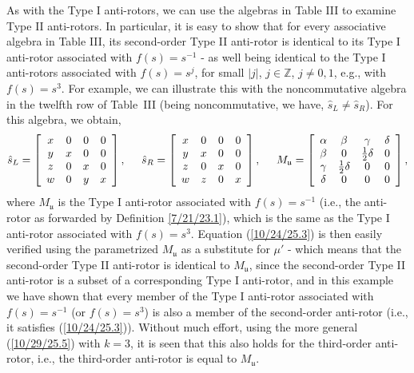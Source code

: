 \documentclass{amsart}
\theoremstyle{definition}
\numberwithin{theorem}{section}
\numberwithin{equation}{section}
\begin{document}
As with the Type I anti-rotors, we can use the algebras in Table III to examine Type II anti-rotors.  In particular, it is easy to show that for every associative algebra in Table III, its second-order Type II anti-rotor is identical to its Type I anti-rotor associated with $f(s)=s^{-1}$ - as well being identical to the Type I anti-rotors associated with \mbox{$f(s)=s^j$}, for small $|j|$, $j\in \mathbb{Z}$, $j\ne 0,1$, e.g., with $f(s)=s^3$.   
For example, we can illustrate this with the noncommutative algebra in the twelfth row of \mbox{Table III} (being noncommutative, we have, $\hat{s}_L\ne \hat{s}_R$).  For this algebra, we obtain,
\[ \hat{s}_L = \left[
\begin{array}{cccc}
x & 0 & 0 & 0   \\
y & x & 0 & 0 \\
z & 0 &  x & 0   \\
w & 0 &  y & x
\end{array}
\right], \hspace{5mm} \hat{s}_R = \left[
\begin{array}{cccc}
x & 0 & 0 & 0   \\
y & x & 0 & 0 \\
z & 0 &  x & 0   \\
w & z &  0 & x  
\end{array}\right], \hspace{5mm} M_\mathfrak{u} = \left[
\begin{array}{cccc}
\alpha & \beta & \gamma & \delta   \\
\beta & 0 & \frac{1}{2}\delta & 0 \\
\gamma & \frac{1}{2}\delta &  0 & 0   \\
\delta & 0 &  0 & 0
\end{array}
\right] ,\] where $M_\mathfrak{u}$ is the Type I anti-rotor associated with $f(s)=s^{-1}$ (i.e., the anti-rotor as forwarded by Definition \ref{7/21/23.1}), which is the same as the Type I anti-rotor associated with $f(s)=s^3$.
Equation (\ref{10/24/25.3}) is then easily verified using the parametrized $M_\mathfrak{u}$ as a substitute for $\mu'$ - which means that the second-order Type II anti-rotor is identical to $M_\mathfrak{u}$, since the second-order Type II anti-rotor is a subset of a corresponding Type I anti-rotor, and in this example we have shown that every member of the Type I anti-rotor associated with $f(s)=s^{-1}$ (or $f(s)=s^3$) is also a member of the second-order anti-rotor (i.e., it satisfies (\ref{10/24/25.3})).  Without much effort, using the more general (\ref{10/29/25.5}) with $k=3$, it is seen that this also holds for the third-order anti-rotor, i.e., the third-order anti-rotor is equal to $M_\mathfrak{u}$.   
\end{document}
